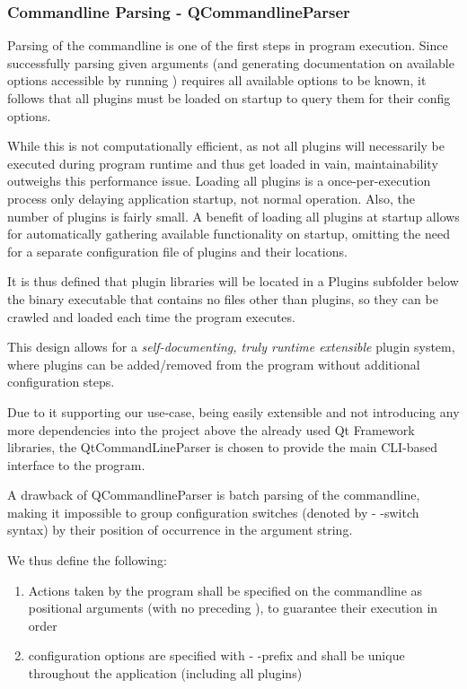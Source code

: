 \subsubsection{Commandline Parsing - QCommandlineParser}
Parsing of the commandline is one of the first steps in program execution. Since successfully parsing given arguments (and generating documentation on available options accessible by running ) requires all available options to be known, it follows that all plugins must be loaded on startup to query them for their config options.

While this is not computationally efficient, as not all plugins will necessarily be executed during program runtime and thus get loaded in vain, maintainability outweighs this performance issue.
Loading all plugins is a once-per-execution process only delaying application startup, not normal operation. Also, the number of plugins is fairly small. A benefit of loading all plugins at startup allows for automatically gathering available functionality on startup, omitting the need for a separate configuration file of plugins and their locations.

It is thus defined that plugin libraries will be located in a Plugins subfolder below the binary executable that contains no files other than plugins, so they can be crawled and loaded each time the program executes.

This design allows for a \emph{self-documenting, truly runtime extensible} plugin system, where plugins can be added/removed from the program without additional configuration steps.

Due to it supporting our use-case, being easily extensible and not introducing any more dependencies into the project above the already used Qt Framework libraries, the QtCommandLineParser is chosen to provide the main CLI-based interface to the program.

A drawback of QCommandlineParser is batch parsing of the commandline, making it impossible to group configuration switches (denoted by - -switch syntax) by their position of occurrence in the argument string.

We thus define the following:
\begin{enumerate}
	\item Actions taken by the program shall be specified on the commandline as positional arguments (with no preceding \cmd{-}), to guarantee their execution in order
	\item configuration options are specified with - -prefix and shall be unique throughout the application (including all plugins)
\end{enumerate}

